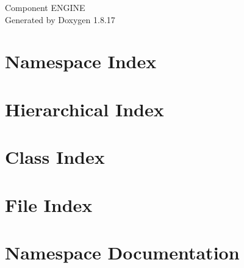 \let\mypdfximage\pdfximage\def\pdfximage{\immediate\mypdfximage}\documentclass[twoside]{book}
\newcommand{\+}{\discretionary{\mbox{\scriptsize$\hookleftarrow$}}{}{}}
\newcommand{\clearemptydoublepage}{%
  \newpage{\pagestyle{empty}\cleardoublepage}%
}
\begin{document}
\hypersetup{pageanchor=false,
             bookmarksnumbered=true,
             pdfencoding=unicode
            }
\begin{titlepage}
\vspace*{7cm}
\begin{center}%
{\Large Component E\+N\+G\+I\+NE }\\
\vspace*{1cm}
{\large Generated by Doxygen 1.8.17}\\
\end{center}
\end{titlepage}
\clearemptydoublepage
{}
\tableofcontents
\clearemptydoublepage
{}
\hypersetup{pageanchor=true}

\chapter{Namespace Index}

\chapter{Hierarchical Index}

\chapter{Class Index}

\chapter{File Index}

\chapter{Namespace Documentation}


\end{document}
